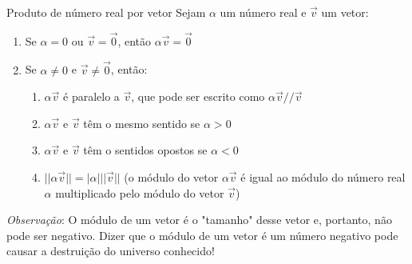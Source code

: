 

\begin{frame}{Produto de número real por vetor}
    Sejam \(\alpha\) um número real e \(\vec{v}\) um vetor:

    \begin{enumerate}
        \item Se \(\alpha =0 \) ou \(\vec{v}=\vec{0}\), então \(\alpha \vec{v}=\vec{0}\)
        \item Se \(\alpha \neq 0 \) e \(\vec{v} \neq \vec{0}\), então:
            \begin{enumerate}
                \item \(\alpha\vec{v}\) é paralelo a \(\vec{v}\), que pode ser escrito como
                    \(\alpha\vec{v} // \vec{v}\)
                \item \(\alpha\vec{v}\) e \(\vec{v}\) têm o mesmo sentido se \(\alpha > 0\)
                \item  \(\alpha\vec{v}\) e \(\vec{v}\) têm o sentidos opostos se \(\alpha < 0\)
                \item \(||\alpha\vec{v}||=|\alpha| ||\vec{v}||\) (o módulo do vetor \(\alpha\vec{v}\) é igual ao módulo do número real \(\alpha\) multiplicado pelo módulo do vetor \(\vec{v}\))
            \end{enumerate}
    \end{enumerate}

    \vspace{1cm}

    \textit{Observação}: O módulo de um vetor é o "tamanho" desse vetor e, portanto, não pode ser negativo. Dizer que o módulo de um
    vetor é um número negativo pode causar a destruição do universo conhecido!
\end{frame}

